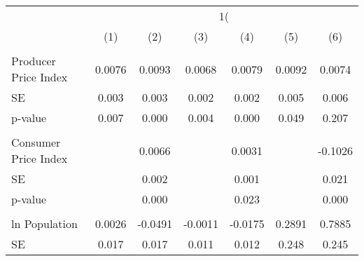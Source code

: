 {
\def\sym#1{\ifmmode^{#1}\else\(^{#1}\)\fi}
\begin{tabular}{l*{6}{c}}
\hline\hline
                    &&&\\\cmidrule(lr){2-3}\cmidrule(lr){4-5}\cmidrule(lr){6-7}
                    &         &         &         &         &         &         \\
\hline
\hline
\\ Producer Price Index&      0.0076         &      0.0093         &      0.0068         &      0.0079         &      0.0092         &      0.0074         \\
\hspace{15pt} SE    &       0.003         &       0.003         &       0.002         &       0.002         &       0.005         &       0.006         \\
\hspace{15pt} p-value&       0.007         &       0.000         &       0.004         &       0.000         &       0.049         &       0.207         \\
\\ Consumer Price Index&                     &      0.0066         &                     &      0.0031         &                     &     -0.1026         \\
\hspace{15pt} SE    &                     &       0.002         &                     &       0.001         &                     &       0.021         \\
\hspace{15pt} p-value&                     &       0.000         &                     &       0.023         &                     &       0.000         \\
\\ ln Population    &      0.0026         &     -0.0491         &     -0.0011         &     -0.0175         &      0.2891         &      0.7885         \\
\hspace{15pt} SE    &       0.017         &       0.017         &       0.011         &       0.012         &       0.248         &       0.245         \\

\end{tabular}}
